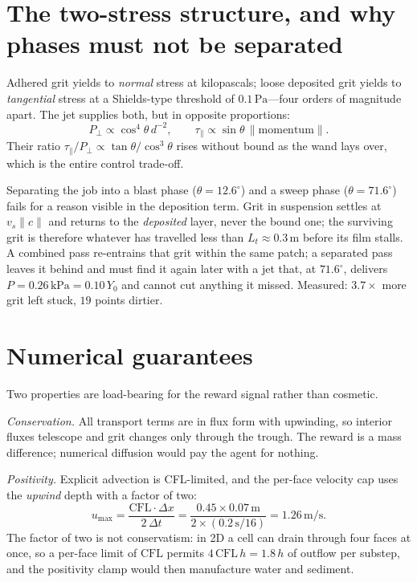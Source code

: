 \documentclass[11pt,a4paper]{article}
\newcommand{\SI}[2]{\ensuremath{#1\,#2}}
\newcommand{\ang}[1]{\ensuremath{#1^{\circ}}}
\newcommand{\per}{\ensuremath{/}}
\newcommand{\metre}{\ensuremath{\mathrm{m}}}
\newcommand{\second}{\ensuremath{\mathrm{s}}}
\newcommand{\pascal}{\ensuremath{\mathrm{Pa}}}
\newcommand{\kilo}{\ensuremath{\mathrm{k}}}
\begin{document}
\section{The two-stress structure, and why phases must not be separated}

Adhered grit yields to \emph{normal} stress at kilopascals; loose deposited grit
yields to \emph{tangential} stress at a Shields-type threshold of
\SI{0.1}{\pascal}---four orders of magnitude apart. The jet supplies both, but
in opposite proportions:
\begin{equation}
  P_{\perp} \propto \cos^{4}\theta\,d^{-2},
  \qquad
  \tau_{\parallel} \propto \sin\theta\,\lVert\text{momentum}\rVert .
\end{equation}
Their ratio $\tau_{\parallel}/P_{\perp} \propto \tan\theta/\cos^{3}\theta$ rises
without bound as the wand lays over, which is the entire control trade-off.

Separating the job into a blast phase ($\theta=\ang{12.6}$) and a sweep phase
($\theta=\ang{71.6}$) fails for a reason visible in the deposition term. Grit in
suspension settles at $v_{s}\lVert c\rVert$ and returns to the \emph{deposited}
layer, never the bound one; the surviving grit is therefore whatever has
travelled less than $L_{t}\approx\SI{0.3}{\metre}$ before its film stalls. A
combined pass re-entrains that grit within the same patch; a separated pass
leaves it behind and must find it again later with a jet that, at \ang{71.6},
delivers $P=\SI{0.26}{\kilo\pascal}=0.10\,Y_{0}$ and cannot cut anything it
missed. Measured: $3.7\times$ more grit left stuck, $19$ points dirtier.

\section{Numerical guarantees}

Two properties are load-bearing for the reward signal rather than cosmetic.

\emph{Conservation.} All transport terms are in flux form with upwinding, so
interior fluxes telescope and grit changes only through the trough. The reward
is a mass difference; numerical diffusion would pay the agent for nothing.

\emph{Positivity.} Explicit advection is CFL-limited, and the per-face velocity
cap uses the \emph{upwind} depth with a factor of two:
\begin{equation}
  u_{\max} = \frac{\mathrm{CFL}\cdot \Delta x}{2\,\Delta t}
  = \frac{0.45\times\SI{0.07}{\metre}}{2\times(\SI{0.2}{\second}/16)}
  = \SI{1.26}{\metre\per\second}.
\end{equation}
The factor of two is not conservatism: in 2D a cell can drain through four faces
at once, so a per-face limit of $\mathrm{CFL}$ permits $4\,\mathrm{CFL}\,h =
1.8\,h$ of outflow per substep, and the positivity clamp would then manufacture
water and sediment.
\end{document}
